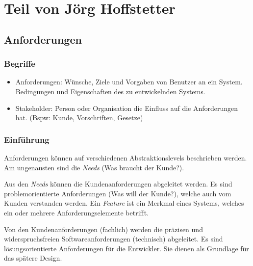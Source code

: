 \chapter{Teil von Jörg Hoffstetter}

\section{Anforderungen}

\subsection{Begriffe}
\begin{itemize}
	\item Anforderungen: Wünsche, Ziele und Vorgaben von Benutzer an ein System. Bedingungen und Eigenschaften des zu entwickelnden Systems.
	\item Stakeholder: Person oder Organisation die Einfluss auf die Anforderungen hat. (Bspw: Kunde, Vorschriften, Gesetze)
\end{itemize}

\subsection{Einführung}

Anforderungen können auf verschiedenen Abstraktionslevels beschrieben werden. Am ungenausten sind die \emph{Needs} (Was braucht der Kunde?).

Aus den \emph{Needs} können die Kundenanforderungen abgeleitet werden. Es sind problemorientierte Anforderungen (Was will der Kunde?), welche auch vom Kunden verstanden werden. Ein \emph{Feature} ist ein Merkmal eines Systems, welches ein oder mehrere Anforderungselemente betrifft.

Von den Kundenanforderungen (fachlich) werden die präzisen und widerspruchsfreien Softwareanforderungen (technisch) abgeleitet. Es sind lösungsorientierte Anforderungen für die Entwickler. Sie dienen als Grundlage für das spätere Design.


